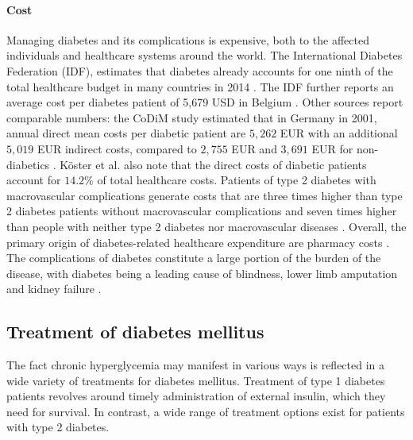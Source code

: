 \paragraph{Cost} Managing diabetes and its complications is expensive, both to the affected individuals and healthcare systems around the world.  The International Diabetes Federation (IDF), estimates that diabetes already accounts for one ninth of the total healthcare budget in many countries in 2014 \citep{IDFfacts}. The IDF further reports an average cost per diabetes patient of 5,679 USD in Belgium \citep{IDFatlas}. Other sources report comparable numbers: the CoDiM study estimated that in Germany in 2001, annual direct mean costs per diabetic patient are $5,262$ EUR with an additional $5,019$ EUR indirect costs, compared to $2,755$ EUR and $3,691$ EUR for non-diabetics \citep{koster2006cost}. K\"oster et al. \citep{koster2006cost} also note that the direct costs of diabetic patients account for $14.2\%$ of total healthcare costs. Patients of type 2 diabetes with macrovascular complications generate costs that are three times higher than type 2 diabetes patients without macrovascular complications and seven times higher than people with neither type 2 diabetes nor macrovascular diseases \citep{beulens2010global}. Overall, the primary origin of diabetes-related healthcare expenditure are pharmacy costs \citep{nichols2002impact, gandra2006total}. The complications of diabetes constitute a large portion of the burden of the disease, with diabetes being a leading cause of blindness, lower limb amputation and kidney failure \citep{beulens2010global}. 





\subsection{Treatment of diabetes mellitus} \label{intro:treatment}
The fact chronic hyperglycemia may manifest in various ways is reflected in a wide variety of treatments for diabetes mellitus. Treatment of type 1 diabetes patients revolves around timely administration of external insulin, which they need for survival. In contrast, a wide range of treatment options exist for patients with type 2 diabetes.


